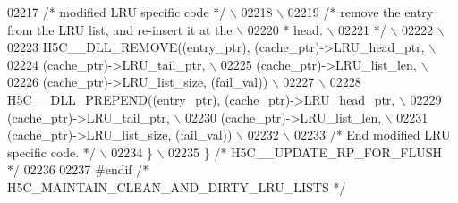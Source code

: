 \begin{DoxyCode}
02217 \textcolor{preprocessor}{        }\textcolor{comment}{/* modified LRU specific code */}\textcolor{preprocessor}{                                    \(\backslash\)}
02218 \textcolor{preprocessor}{                                                                            \(\backslash\)}
02219 \textcolor{preprocessor}{        }\textcolor{comment}{/* remove the entry from the LRU list, and re-insert it at the      \(\backslash\)}
02220 \textcolor{comment}{     * head.                                                            \(\backslash\)}
02221 \textcolor{comment}{     */}\textcolor{preprocessor}{                                                                 \(\backslash\)}
02222 \textcolor{preprocessor}{                                                                            \(\backslash\)}
02223 \textcolor{preprocessor}{        H5C\_\_DLL\_REMOVE((entry\_ptr), (cache\_ptr)->LRU\_head\_ptr,             \(\backslash\)}
02224 \textcolor{preprocessor}{                        (cache\_ptr)->LRU\_tail\_ptr,                          \(\backslash\)}
02225 \textcolor{preprocessor}{            (cache\_ptr)->LRU\_list\_len,                          \(\backslash\)}
02226 \textcolor{preprocessor}{                        (cache\_ptr)->LRU\_list\_size, (fail\_val))             \(\backslash\)}
02227 \textcolor{preprocessor}{                                                                            \(\backslash\)}
02228 \textcolor{preprocessor}{        H5C\_\_DLL\_PREPEND((entry\_ptr), (cache\_ptr)->LRU\_head\_ptr,            \(\backslash\)}
02229 \textcolor{preprocessor}{                         (cache\_ptr)->LRU\_tail\_ptr,                         \(\backslash\)}
02230 \textcolor{preprocessor}{             (cache\_ptr)->LRU\_list\_len,                         \(\backslash\)}
02231 \textcolor{preprocessor}{                         (cache\_ptr)->LRU\_list\_size, (fail\_val))            \(\backslash\)}
02232 \textcolor{preprocessor}{                                                                            \(\backslash\)}
02233 \textcolor{preprocessor}{        }\textcolor{comment}{/* End modified LRU specific code. */}\textcolor{preprocessor}{                               \(\backslash\)}
02234 \textcolor{preprocessor}{    \}                                                                       \(\backslash\)}
02235 \textcolor{preprocessor}{\} }\textcolor{comment}{/* H5C\_\_UPDATE\_RP\_FOR\_FLUSH */}\textcolor{preprocessor}{}
02236 
02237 \textcolor{preprocessor}{#endif }\textcolor{comment}{/* H5C\_MAINTAIN\_CLEAN\_AND\_DIRTY\_LRU\_LISTS */}\textcolor{preprocessor}{}

\end{DoxyCode}
